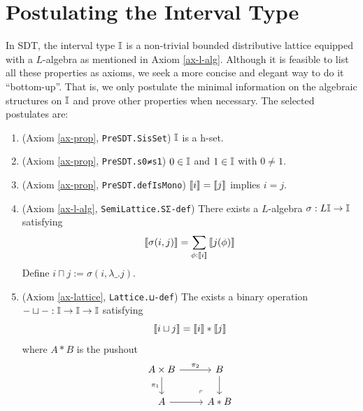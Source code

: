 \section{Postulating the Interval Type}
In SDT, the interval type $\mathbb{I}$ is a non-trivial bounded distributive lattice equipped with a $L$-algebra as mentioned in Axiom \ref{ax-l-alg}. Although it is feasible to list all these properties as axioms, we seek a more concise and elegant way to do it ``bottom-up''. That is, we only postulate the minimal information on the algebraic structures on $\mathbb{I}$ and prove other properties when necessary. The selected postulates are:
\begin{enumerate}
    \item (Axiom \ref{ax-prop}, \verb|PreSDT.SisSet|) $\mathbb{I}$ is a h-set.
    \item (Axiom \ref{ax-prop}, \verb|PreSDT.s0≠s1|) $0\in\mathbb{I}$ and $1\in\mathbb{I}$ with $0\ne1$.
    \item (Axiom \ref{ax-prop}, \verb|PreSDT.defIsMono|) $\left\llbracket i\right\rrbracket=\left\llbracket j\right\rrbracket$ implies $i=j$.
    \item (Axiom \ref{ax-l-alg}, \verb|SemiLattice.SΣ-def|) There exists a $L$-algebra $\sigma:L\mathbb{I}\to\mathbb{I}$ satisfying
    $$\left\llbracket\sigma(i,j)\right\rrbracket=\sum_{\phi:\left\llbracket i\right\rrbracket}\left\llbracket j(\phi)\right\rrbracket$$
    Define $i\sqcap j:=\sigma(i,\lambda\_.j)$.
    \item (Axiom \ref{ax-lattice}, \verb|Lattice.⊔-def|) The exists a binary operation $-\sqcup-:\mathbb{I}\to\mathbb{I}\to\mathbb{I}$ satisfying
    $$\left\llbracket i\sqcup j\right\rrbracket=\left\llbracket i\right\rrbracket*\left\llbracket j\right\rrbracket$$
    where $A*B$ is the pushout
    \[\begin{tikzcd}
        {A\times B} & B \\
        A & {A*B}
        \arrow["{\pi_2}", from=1-1, to=1-2]
        \arrow["{\pi_1}"', from=1-1, to=2-1]
        \arrow[from=1-2, to=2-2]
        \arrow[from=2-1, to=2-2]
        \arrow["\lrcorner"{anchor=center, pos=0.125, rotate=180}, draw=none, from=2-2, to=1-1]
    \end{tikzcd}\]
\end{enumerate}

